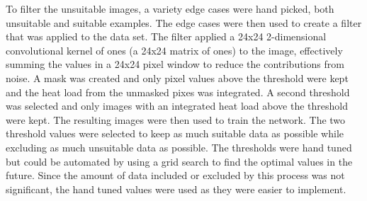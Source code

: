 To filter the unsuitable images, a variety edge cases were hand picked, both unsuitable and suitable examples. The edge cases were then used to create a filter that was applied to the data set. The filter applied a 24x24 2-dimensional convolutional kernel of ones (a 24x24 matrix of ones) to the image, effectively summing the values in a 24x24 pixel window to reduce the contributions from noise. A mask was created and only pixel values above the threshold were kept and the heat load from the unmasked pixes was integrated. A second threshold was selected and only images with an integrated heat load above the threshold were kept. The resulting images were then used to train the network. The two threshold values were selected to keep as much suitable data as possible while excluding as much unsuitable data as possible. The thresholds were hand tuned but could be automated by using a grid search to find the optimal values in the future. Since the amount of data included or excluded by this process was not significant, the hand tuned values were used as they were easier to implement.